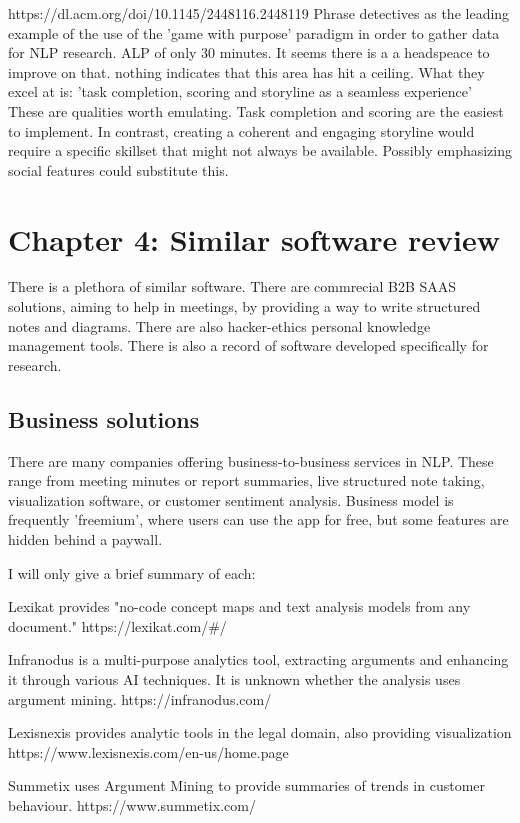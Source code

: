 \documentclass{article}
\begin{document}
https://dl.acm.org/doi/10.1145/2448116.2448119
Phrase detectives as the leading example of the use of the 'game with purpose' paradigm in order to gather data for NLP research.
ALP of only 30 minutes. It seems there is a a headspeace to improve on that. nothing indicates that this area has hit a ceiling.
What they excel at is: 'task completion, scoring and storyline as a seamless experience'
These are qualities worth emulating. Task completion and scoring are the easiest to implement. 
In contrast, creating a coherent and engaging storyline would require a specific skillset that might not always be available.
Possibly emphasizing social features could substitute this.

\section{Chapter 4: Similar software review}
There is a plethora of similar software. 
There are commrecial B2B SAAS solutions, aiming to help in meetings, by providing a way to write structured notes and diagrams.
There are also hacker-ethics personal knowledge management tools.
There is also a record of software developed specifically for research.

\subsection{Business solutions}
There are many companies offering business-to-business services in NLP. 
These range from meeting minutes or report summaries, live structured note taking, visualization software, or customer sentiment analysis.
Business model is frequently 'freemium', where users can use the app for free, but some features are hidden behind a paywall.

I will only give a brief summary of each:

Lexikat provides "no-code concept maps and text analysis models from any document."
https://lexikat.com/#/

Infranodus is a multi-purpose analytics tool, extracting arguments and enhancing it through various AI techniques. 
It is unknown whether the analysis uses argument mining.
https://infranodus.com/

Lexisnexis provides analytic tools in the legal domain, also providing visualization
https://www.lexisnexis.com/en-us/home.page

Summetix uses Argument Mining to provide summaries of trends in customer behaviour.
https://www.summetix.com/
\end{document}
